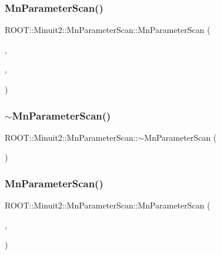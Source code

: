 \subsubsection{\texorpdfstring{MnParameterScan()}{MnParameterScan()}\hspace{0.1cm}{\footnotesize\ttfamily [4/6]}}
{\footnotesize\ttfamily R\+O\+O\+T\+::\+Minuit2\+::\+Mn\+Parameter\+Scan\+::\+Mn\+Parameter\+Scan (\begin{DoxyParamCaption}\item[{const \mbox{\hyperlink{classROOT_1_1Minuit2_1_1FCNBase}{F\+C\+N\+Base}} \&}]{,  }\item[{const \mbox{\hyperlink{classROOT_1_1Minuit2_1_1MnUserParameters}{Mn\+User\+Parameters}} \&}]{,  }\item[{double}]{ }\end{DoxyParamCaption})}

\mbox{\label{classROOT_1_1Minuit2_1_1MnParameterScan_af9a8ee2b797033783fe832ebe727ddc2}} 
\subsubsection{\texorpdfstring{$\sim$MnParameterScan()}{~MnParameterScan()}\hspace{0.1cm}{\footnotesize\ttfamily [2/3]}}
{\footnotesize\ttfamily R\+O\+O\+T\+::\+Minuit2\+::\+Mn\+Parameter\+Scan\+::$\sim$\+Mn\+Parameter\+Scan (\begin{DoxyParamCaption}{ }\end{DoxyParamCaption})\hspace{0.3cm}{\ttfamily [inline]}}

\mbox{\label{classROOT_1_1Minuit2_1_1MnParameterScan_a74db5691c231aae4eb0291501a046ae4}} 
\subsubsection{\texorpdfstring{MnParameterScan()}{MnParameterScan()}\hspace{0.1cm}{\footnotesize\ttfamily [5/6]}}
{\footnotesize\ttfamily R\+O\+O\+T\+::\+Minuit2\+::\+Mn\+Parameter\+Scan\+::\+Mn\+Parameter\+Scan (\begin{DoxyParamCaption}\item[{const \mbox{\hyperlink{classROOT_1_1Minuit2_1_1FCNBase}{F\+C\+N\+Base}} \&}]{,  }\item[{const \mbox{\hyperlink{classROOT_1_1Minuit2_1_1MnUserParameters}{Mn\+User\+Parameters}} \&}]{ }\end{DoxyParamCaption})}

